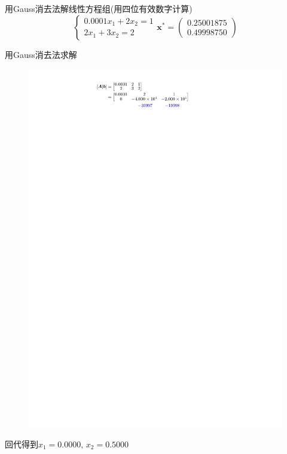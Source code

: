 \begin{example}
    用Gauss消去法解线性方程组(用四位有效数字计算)
    \[
        \left\{\begin{array}{c}0.0001x_1+2x_2=1\\2x_1+3x_2=2\end{array}\right.\boldsymbol{x}^*=\left(\begin{matrix}0.25001875\\0.49998750\end{matrix}\right)
    \]
    \begin{solution}
        用Gauss消去法求解
        \begin{figure}[h]
            \centering
            \includegraphics{image/Gauss-example1.pdf}
        \end{figure}
        回代得到$x_1 = 0.0000,\,x_2 = 0.5000$
    \end{solution}
\end{example}
